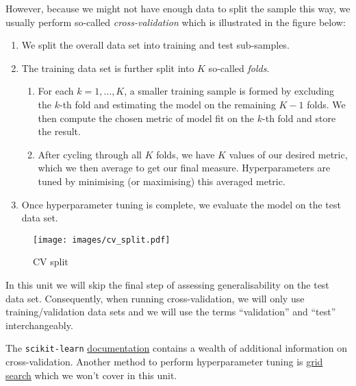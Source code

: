 \documentclass{scrartcl}
\providecommand{\tightlist}{%
      \setlength{\itemsep}{0pt}\setlength{\parskip}{0pt}}
\begin{document}
However, because we might not have enough data to split the sample this
way, we usually perform so-called \emph{cross-validation} which is
illustrated in the figure below:

\begin{enumerate}
\def\labelenumi{\arabic{enumi}.}
\tightlist
\item
  We split the overall data set into training and test sub-samples.
\item
  The training data set is further split into \(K\) so-called
  \emph{folds}.

  \begin{enumerate}
  \def\labelenumii{\arabic{enumii}.}
  \tightlist
  \item
    For each \(k = 1,\dots,K\), a smaller training sample is formed by
    excluding the \(k\)-th fold and estimating the model on the
    remaining \(K-1\) folds. We then compute the chosen metric of model
    fit on the \(k\)-th fold and store the result.
  \item
    After cycling through all \(K\) folds, we have \(K\) values of our
    desired metric, which we then average to get our final measure.
    Hyperparameters are tuned by minimising (or maximising) this
    averaged metric.
  \end{enumerate}
\item
  Once hyperparameter tuning is complete, we evaluate the model on the
  test data set.
\end{enumerate}

    \begin{figure}
\centering
\begin{adjustbox}{max totalheight=0.4\textheight}
\texttt{[image: images/cv\_split.pdf]}
\end{adjustbox}
\caption{CV split}
\end{figure}

    In this unit we will skip the final step of assessing generalisability
on the test data set. Consequently, when running cross-validation, we
will only use training/validation data sets and we will use the terms
``validation'' and ``test'' interchangeably.

The \texttt{scikit-learn}
\href{https://scikit-learn.org/stable/modules/cross_validation.html}{documentation}
contains a wealth of additional information on cross-validation. Another
method to perform hyperparameter tuning is
\href{https://scikit-learn.org/stable/modules/grid_search.html}{grid
search} which we won't cover in this unit.
\end{document}
